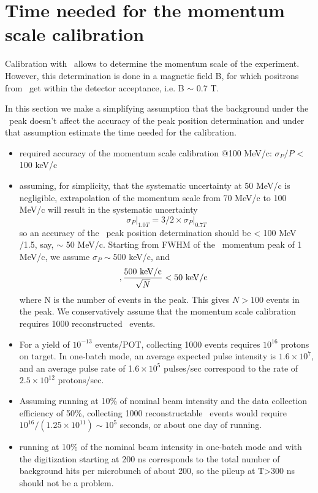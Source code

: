 \section{Time needed for the momentum scale calibration }

Calibration with \piplusenu\ allows to determine the momentum scale of the experiment.
However, this determination is done in a magnetic field B, for which positrons
from \piplusenu\ get within the detector acceptance, i.e. B $\sim$ 0.7 T.

In this section we make a simplifying assumption that the background under the \piplusenu\
peak doesn't affect the accuracy of the peak position determination and under that assumption
estimate the time needed for the calibration.

\begin{itemize}
\item 
  required accuracy of the momentum scale calibration $@$100 MeV/c: $\sigma_P/P$ < 100 keV/c
\item
  assuming, for simplicity, that the systematic uncertainty at 50 MeV/c is negligible,
  extrapolation of the momentum scale from 70 MeV/c to 100 MeV/c will result in the
  systematic uncertainty
  $$
  \sigma_P \bigg\rvert_{1.0 T} = 3/2 \times \sigma_P  \bigg\rvert_{0.7 T}
  $$
  so an accuracy of the \piplusenu\ peak position determination should be < 100 MeV /1.5, say, $\sim$ 50 MeV/c.
  Starting from FWHM of the \piplusenu\ momentum peak of 1 MeV/c, we assume $\sigma_P \sim 500$ keV/c, and 
  $$,
  \frac {500 {\rm ~keV/c}}{\sqrt N} <  50 {\rm ~keV/c} ~~
  $$
  where N is the number of events in the peak. This gives $N > 100$ events in the peak.
  We conservatively assume that the momentum scale calibration requires 1000 reconstructed \piplusenu\ events.
\item
  For a yield of $10^{-13}$ events/POT, collecting 1000 events requires $10^{16}$ protons on target.
  In one-batch mode, an average expected pulse intensity is $1.6 \times 10^7$, and
  an average  pulse rate of 1$.6 \times 10^5$ pulses/sec correspond to the rate of $2.5 \times 10^{12}$ protons/sec.
\item
  Assuming running at 10\% of nominal beam intensity and the data collection efficiency of 50\%,
  collecting 1000 reconstructable \piplusenu\ events would require
  $10^{16}/(1.25 \times 10^{11}) \sim 10^5$ seconds, or about one day of running.
\item
  running at 10\% of the nominal beam intensity in one-batch mode and with the digitization starting
  at 200 ns corresponds to the total number of background hits per microbunch of about 200,
  so the pileup at T>300 ns should not be a problem.
\end{itemize}

